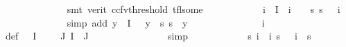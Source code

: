 \begin{isabellebody}
\ \ \ \ \ \ \ \ \ \ \ \ \isamarkupfalse%
\ {\isacharparenleft}{\kern0pt}smt\ {\isacharparenleft}{\kern0pt}verit{\isacharcomma}{\kern0pt}\ ccfv{\isacharunderscore}{\kern0pt}threshold{\isacharparenright}{\kern0pt}\ tfl{\isacharunderscore}{\kern0pt}some{\isacharparenright}{\kern0pt}\isanewline
\ \ \ \ \ \ \ \ \ \ \isamarkupfalse%
\ {\isachardoublequoteopen}{\isasymforall}i\ {\isasymin}\ I{\isachardot}{\kern0pt}\ {\isasymPhi}\ i\ {\isasymnoteq}\ {\isasymphi}\ {\isasymlongrightarrow}\ {\isacharparenleft}{\kern0pt}{\isasymforall}s{\isachardot}{\kern0pt}\ s\ {\isasymTurnstile}\ {\isasymPhi}\ i{\isacharparenright}{\kern0pt}{\isachardoublequoteclose}\isanewline
\ \ \ \ \ \ \ \ \ \ \ \ \isamarkupfalse%
\ {\isacharparenleft}{\kern0pt}simp\ add{\isacharcolon}{\kern0pt}\ {\isacartoucheopen}{\isasymforall}y{\isasymin}{\isasymPhi}\ {\isacharbackquote}{\kern0pt}\ I{\isachardot}{\kern0pt}\ {\isasymphi}\ {\isasymnoteq}\ y\ {\isasymlongrightarrow}\ {\isacharparenleft}{\kern0pt}{\isasymforall}s{\isachardot}{\kern0pt}\ s\ {\isasymTurnstile}\ y{\isacharparenright}{\kern0pt}{\isacartoucheclose}{\isacharparenright}{\kern0pt}\ \isanewline
\ \ \ \ \ \ \ \ \ \ \isamarkupfalse%
\ {\isachardoublequoteopen}{\isasymPsi}\ {\isacharbackquote}{\kern0pt}\ {\isacharbraceleft}{\kern0pt}i{\isacharunderscore}{\kern0pt}{\isasymphi}{\isacharbraceright}{\kern0pt}\ {\isacharequal}{\kern0pt}\ {\isacharbraceleft}{\kern0pt}{\isasympsi}{\isacharbraceright}{\kern0pt}{\isachardoublequoteclose}\ \isanewline
\ \ \ \ \ \ \ \ \ \ \ \ \isamarkupfalse%
\ {\isasymPsi}{\isacharunderscore}{\kern0pt}def\ {\isacartoucheopen}{\isasymphi}{\isasymin}{\isasymPhi}\ {\isacharbackquote}{\kern0pt}\ I{\isacartoucheclose}\ {\isacartoucheopen}{\isasymphi}\ {\isasymnotin}\ {\isasymPhi}\ {\isacharbackquote}{\kern0pt}\ J{\isacartoucheclose}\ {\isacartoucheopen}I\ {\isasyminter}\ J\ {\isacharequal}{\kern0pt}\ {\isacharbraceleft}{\kern0pt}{\isacharbraceright}{\kern0pt}{\isacartoucheclose}\isanewline
\ \ \ \ \ \ \ \ \ \ \ \ \isamarkupfalse%
\ simp\isanewline
\ \ \ \ \ \ \ \ \ \ \isamarkupfalse%
\ {\isachardoublequoteopen}{\isasymforall}s{\isachardot}{\kern0pt}\ {\isacharparenleft}{\kern0pt}{\isasymforall}i\ {\isasymin}\ {\isacharbraceleft}{\kern0pt}i{\isacharunderscore}{\kern0pt}{\isasymphi}{\isacharbraceright}{\kern0pt}{\isachardot}{\kern0pt}\ s\ {\isasymTurnstile}\ {\isacharparenleft}{\kern0pt}{\isasymPsi}\ i{\isacharparenright}{\kern0pt}{\isacharparenright}{\kern0pt}\ {\isasymlongleftrightarrow}\ s\ {\isasymTurnstile}\ {\isasympsi}{\isachardoublequoteclose}\ \isanewline

\end{isabellebody}
